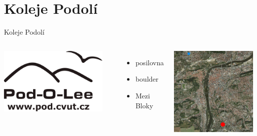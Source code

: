 \documentclass{beamer}
\begin{document}
\section{Koleje Podolí}
\begin{frame}{Koleje Podolí}
	\begin{columns}[c]
			\begin{center}
				\includegraphics[width=0.9\textwidth]{logo_pod.png}
			\end{center}

			\begin{itemize}
				\item posilovna
				\item boulder
				\item Mezi Bloky
			\end{itemize}
			\begin{center}
				\includegraphics[width=\textwidth]{mapa_pod.png}
			\end{center}
	\end{columns}

\end{frame}
\end{document}
